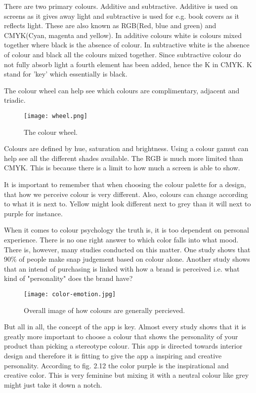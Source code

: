 There are two primary colours. Additive and subtractive. Additive is used on screens as it gives away light and subtractive is used for e.g. book covers as it reflects light. \cite{Colour}
These are also known as RGB(Red, blue and green) and CMYK(Cyan, magenta and yellow).
In additive colours white is colours mixed together where black is the absence of colour. In subtractive white is the absence of colour and black all the colours mixed together. 
Since subtractive colour do not fully absorb light a fourth element has been added, hence the K in CMYK. K stand for 'key' which essentially is black.\cite{Colour}

The colour wheel can help see which colours are complimentary, adjacent and triadic. 
\begin{figure}[H]
\centering
\texttt{[image: wheel.png]}
\caption{The colour wheel. \cite{Colour}}
\end{figure}

Colours are defined by hue, saturation and brightness. 
Using a colour gamut can help see all the different shades available. The RGB is much more limited than CMYK. This is because there is a limit to how much a screen is able to show. 

It is important to remember that when choosing the colour palette for a design, that how we perceive colour is very different. Also, colours can change according to what it is next to. Yellow might look different next to grey than it will next to purple for instance. \cite{Colour}

When it comes to colour psychology the truth is, it is too dependent on personal experience. There is no one right answer to which color falls into what mood. \cite{ColorMeaning}
There is, however, many studies conducted on this matter. 
One study shows that 90\% of people make snap judgement based on colour alone. \cite{ColorMeaning} Another study shows that an intend of purchasing is linked with how a brand is perceived i.e. what kind of "personality" does the brand have?\cite{ColorMeaning}

\begin{figure}[H]
\centering
\texttt{[image: color-emotion.jpg]}
\caption{Overall image of how colours are generally percieved. \cite{ColorMeaning}}
\end{figure}

But all in all, the concept of the app is key. Almost every study shows that it is greatly more important to choose a colour that shows the personality of your product than picking a stereotype colour. \cite{ColorMeaning} This app is directed towards interior design and therefore it is fitting to give the app a inspiring and creative personality. According to fig. 2.12 the color purple is the inspirational and creative color. This is very feminine but mixing it with a neutral colour like grey might just take it down a notch. %

